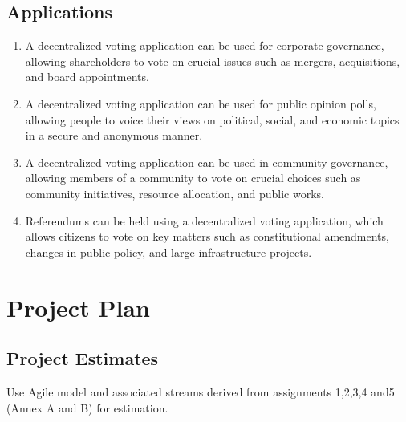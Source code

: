 \documentclass[oneside, 12pt]{book}
\begin{document}
		\subsection{Applications}
			\begin{enumerate}
				\item A decentralized voting application can be used for corporate governance, allowing shareholders to vote on crucial issues such as mergers, acquisitions, and board appointments.
				\item A decentralized voting application can be used for public opinion polls, allowing people to voice their views on political, social, and economic topics in a secure and anonymous manner.
				\item A decentralized voting application can be used in community governance, allowing members of a community to vote on crucial choices such as community initiatives, resource allocation, and public works.
				\item Referendums can be held using a decentralized voting application, which allows citizens to vote on key matters such as constitutional amendments, changes in public policy, and large infrastructure projects.
			\end{enumerate}
	\newpage
	\section{Project Plan}
	\newpage
		\subsection{Project Estimates}
			Use Agile model and associated streams derived from assignments 1,2,3,4 and5 (Annex A and B) for estimation.
\end{document}
